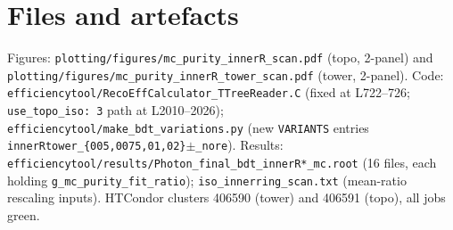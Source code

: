 \documentclass[11pt,a4paper]{article}
\begin{document}
\section*{Files and artefacts}

Figures: \texttt{plotting/figures/mc\_purity\_innerR\_scan.pdf}
(topo, 2-panel) and
\texttt{plotting/figures/mc\_purity\_innerR\_tower\_scan.pdf}
(tower, 2-panel).
Code: \texttt{efficiencytool/RecoEffCalculator\_TTreeReader.C}
(fixed at L722--726; \texttt{use\_topo\_iso: 3} path at L2010--2026);
\texttt{efficiencytool/make\_bdt\_variations.py} (new
\texttt{VARIANTS} entries
\texttt{innerRtower\_\{005,0075,01,02\}}$\pm$\texttt{\_nore}).
Results:
\texttt{efficiencytool/results/Photon\_final\_bdt\_innerR*\_mc.root}
(16 files, each holding \texttt{g\_mc\_purity\_fit\_ratio});
\texttt{iso\_innerring\_scan.txt} (mean-ratio rescaling inputs).
HTCondor clusters 406590 (tower) and 406591 (topo), all jobs green.
\end{document}
